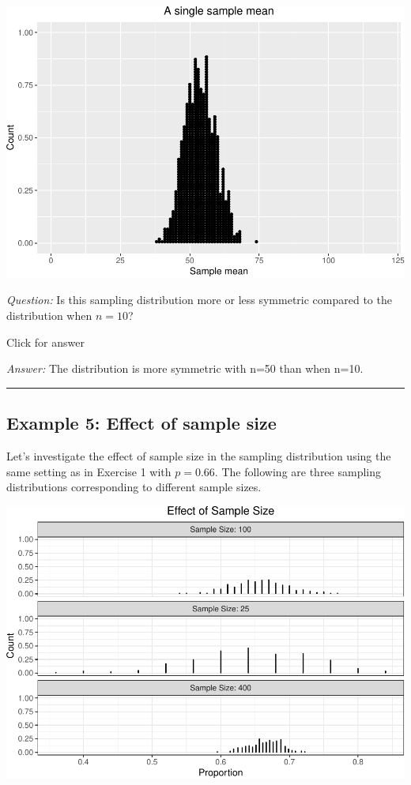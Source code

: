 \documentclass[
]{book}
\begin{document}
\includegraphics[width=1\linewidth]{Class_Activity_7_files/figure-latex/unnamed-chunk-22-1}

\emph{Question:} Is this sampling distribution more or less symmetric compared to the distribution when \(n=10\)?

Click for answer

\emph{Answer:} The distribution is more symmetric with n=50 than when n=10.

\begin{center}\rule{0.5\linewidth}{0.5pt}\end{center}

\hypertarget{example-5-effect-of-sample-size}{%
\subsection{Example 5: Effect of sample size}\label{example-5-effect-of-sample-size}}

Let's investigate the effect of sample size in the sampling distribution using the same setting as in Exercise 1 with \(p=0.66\). The following are three sampling distributions corresponding to different sample sizes.

\includegraphics[width=1\linewidth]{Class_Activity_7_files/figure-latex/unnamed-chunk-23-1}
\end{document}

